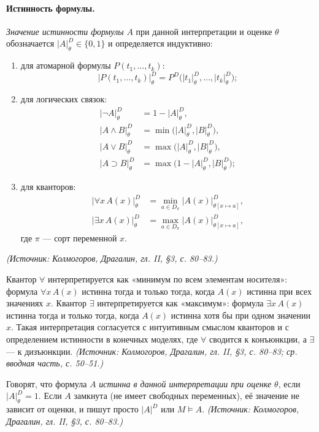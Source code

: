 \documentclass[a4paper,12pt]{article}
\begin{document}
\paragraph{Истинность формулы.} \emph{Значение истинности формулы} \(A\) при данной интерпретации и оценке \(\theta\) обозначается \(|A|^D_\theta\in\{0,1\}\) и определяется индуктивно:
\begin{enumerate}[label=\arabic*)]
\item для атомарной формулы \(P(t_1,\ldots,t_k)\):
\[
|P(t_1,\ldots,t_k)|^D_\theta=P^D\bigl(|t_1|^D_\theta,\ldots,|t_k|^D_\theta\bigr);
\]
\item для логических связок:
\[
\begin{aligned}
|\neg A|^D_\theta&=1-|A|^D_\theta,\\
|A\wedge B|^D_\theta&=\min\bigl(|A|^D_\theta,|B|^D_\theta\bigr),\\
|A\vee B|^D_\theta&=\max\bigl(|A|^D_\theta,|B|^D_\theta\bigr),\\
|A\supset B|^D_\theta&=\max\bigl(1-|A|^D_\theta,|B|^D_\theta\bigr);
\end{aligned}
\]
\item для кванторов:
\[
\begin{aligned}
|\forall x\,A(x)|^D_\theta&=\min_{a\in D_\pi}|A(x)|^D_{\theta[x\mapsto a]},\\
|\exists x\,A(x)|^D_\theta&=\max_{a\in D_\pi}|A(x)|^D_{\theta[x\mapsto a]},
\end{aligned}
\]
где \(\pi\) --- сорт переменной \(x\).
\end{enumerate}
\textit{(Источник: Колмогоров, Драгалин, гл. II, §3, с. 80--83.)}

Квантор \(\forall\) интерпретируется как «минимум по всем элементам носителя»: формула \(\forall x\,A(x)\) истинна тогда и только тогда, когда \(A(x)\) истинна при всех значениях \(x\). Квантор \(\exists\) интерпретируется как «максимум»: формула \(\exists x\,A(x)\) истинна тогда и только тогда, когда \(A(x)\) истинна хотя бы при одном значении \(x\). Такая интерпретация согласуется с интуитивным смыслом кванторов и с определением истинности в конечных моделях, где \(\forall\) сводится к конъюнкции, а \(\exists\) --- к дизъюнкции.
\textit{(Источник: Колмогоров, Драгалин, гл. II, §3, с. 80--83; ср. вводная часть, с. 50--51.)}

Говорят, что формула \(A\) \emph{истинна в данной интерпретации при оценке \(\theta\)}, если \(|A|^D_\theta=1\). Если \(A\) замкнута (не имеет свободных переменных), её значение не зависит от оценки, и пишут просто \(|A|^D\) или \(M\models A\).
\textit{(Источник: Колмогоров, Драгалин, гл. II, §3, с. 80--83.)}
\end{document}
